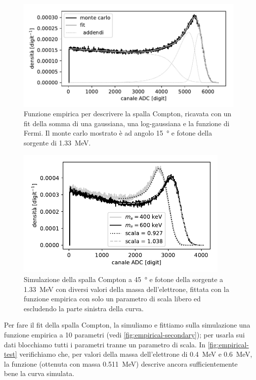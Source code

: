 \begin{figure}
	\centering
	\includegraphics[width=33em]{empirical-secondary}
	\caption{\label{fig:empirical-secondary}
	Funzione empirica per descrivere la spalla Compton,
	ricavata con un fit della somma di una gaussiana, una log-gaussiana e la funzione di Fermi.
	Il monte carlo mostrato è ad angolo \SI{15}{\degree} e fotone della sorgente di \SI{1.33}{MeV}.}
\end{figure}

\begin{figure}
	\centering
	\includegraphics[width=28em]{empirical-test}
	\caption{\label{fig:empirical-test}
	Simulazione della spalla Compton a \SI{45}{\degree} e fotone della sorgente a \SI{1.33}{MeV}
	con diversi valori della massa dell'elettrone,
	fittata con la funzione empirica con solo un parametro di scala libero
	ed escludendo la parte sinistra della curva.}
\end{figure}

Per fare il fit della spalla Compton,
la simuliamo e fittiamo sulla simulazione una funzione empirica a 10 parametri
(vedi \autoref{fig:empirical-secondary});
per usarla sui dati blocchiamo tutti i parametri tranne un parametro di scala.
In \autoref{fig:empirical-test} verifichiamo che,
per valori della massa dell'elettrone di \SI{0.4}{MeV} e \SI{0.6}{MeV},
la funzione (ottenuta con massa \SI{0.511}{MeV}) descrive ancora sufficientemente bene la curva simulata.
